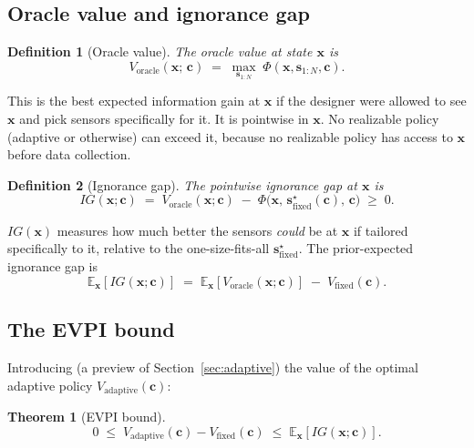 \documentclass[11pt,a4paper]{article}
\newcommand{\E}{\mathbb{E}}
\newtheorem{theorem}{Theorem}
\newtheorem{definition}{Definition}
\begin{document}
\subsection{Oracle value and ignorance gap}

\begin{definition}[Oracle value]
\label{def:oracle}
The oracle value at state $\bm{x}$ is
\begin{equation}
  V_{\mathrm{oracle}}(\bm{x};\, \bm{c}) \;=\; \max_{\bm{s}_{1:N}} \; \Phi(\bm{x}, \bm{s}_{1:N}, \bm{c}).
  \label{eq:oracle}
\end{equation}
\end{definition}

This is the best expected information gain at $\bm{x}$ if the designer were allowed to see $\bm{x}$ and pick sensors specifically for it.  It is pointwise in $\bm{x}$.  No realizable policy (adaptive or otherwise) can exceed it, because no realizable policy has access to $\bm{x}$ before data collection.

\begin{definition}[Ignorance gap]
\label{def:ig}
The pointwise \emph{ignorance gap} at $\bm{x}$ is
\begin{equation}
  \boxed{\;
    IG(\bm{x}; \bm{c}) \;=\; V_{\mathrm{oracle}}(\bm{x}; \bm{c}) \;-\; \Phi\!\bigl(\bm{x},\, \bm{s}^\star_{\mathrm{fixed}}(\bm{c}),\, \bm{c}\bigr) \;\ge\; 0.
  \;}
  \label{eq:IG}
\end{equation}
\end{definition}

$IG(\bm{x})$ measures how much better the sensors \emph{could} be at $\bm{x}$ if tailored specifically to it, relative to the one-size-fits-all $\bm{s}^\star_{\mathrm{fixed}}$.  The prior-expected ignorance gap is
\begin{equation}
  \E_{\bm{x}}[IG(\bm{x}; \bm{c})] \;=\; \E_{\bm{x}}[V_{\mathrm{oracle}}(\bm{x}; \bm{c})] \;-\; V_{\mathrm{fixed}}(\bm{c}).
  \label{eq:evpi_identity}
\end{equation}

\subsection{The EVPI bound}

Introducing (a preview of Section~\ref{sec:adaptive}) the value of the optimal adaptive policy $V_{\mathrm{adaptive}}(\bm{c})$:

\begin{theorem}[EVPI bound]
\label{thm:evpi}
\begin{equation}
  \boxed{\;0 \;\le\; V_{\mathrm{adaptive}}(\bm{c}) - V_{\mathrm{fixed}}(\bm{c}) \;\le\; \E_{\bm{x}}[IG(\bm{x}; \bm{c})].\;}
  \label{eq:evpi}
\end{equation}
\end{theorem}
\end{document}
